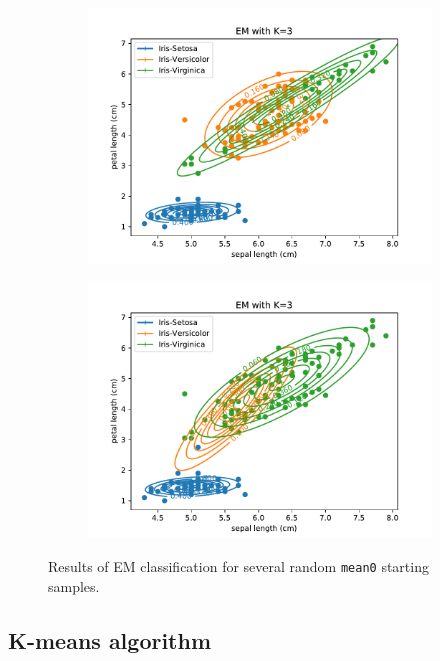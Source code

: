 \documentclass{article}
\begin{document}
\begin{figure}[!ht]
{\begin{subfigure}{0.6\textwidth}
	\includegraphics[width=\textwidth]{./Figures/2_1_EM_randinit2}
	\end{subfigure}
	\begin{subfigure}{0.6\textwidth}
	\includegraphics[width=\textwidth]{./Figures/2_1_EM_randinit3}
	\end{subfigure}
	}	
	\caption{Results of EM classification for several random \texttt{mean0} starting samples.}
	\label{2_1_EM_randinit}
\end{figure}

\clearpage

\subsection{K-means algorithm}
\end{document}
